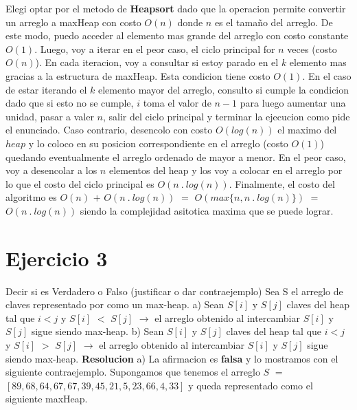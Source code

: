 \documentclass[10pt,a4paper]{article}
\begin{document}
Elegi optar por el metodo de \textbf{Heapsort} dado que la operacion  permite convertir un arreglo a maxHeap con costo $O(n)$ donde $n$ es el tamaño del arreglo. De este modo, puedo acceder al elemento mas grande del arreglo con costo constante $O(1)$. 
\newline
\newline
Luego, voy a iterar en el peor caso, el ciclo principal for $n$ veces (costo $O(n)$). En cada iteracion, voy a consultar si estoy parado en el $k$ elemento mas gracias a la estructura de maxHeap. Esta condicion tiene costo $O(1)$. En el caso de estar iterando el $k$ elemento mayor del arreglo, consulto si cumple la condicion  dado que si esto no se cumple, $i$ toma el valor de $n-1$ para luego aumentar una unidad, pasar a valer $n$, salir del ciclo principal y terminar la ejecucion como pide el enunciado. Caso contrario, desencolo con costo $O(log(n))$ el maximo del $heap$ y lo coloco en su posicion correspondiente en el arreglo (costo $O(1)$) quedando eventualmente el arreglo ordenado de mayor a menor.
\newline
\newline
En el peor caso, voy a desencolar a los $n$ elementos del heap y los voy a colocar en el arreglo por lo que el costo del ciclo principal es $O(n ~.~ log(n))$. 
\newline
\newline
Finalmente, el costo del algoritmo es $O(n)$ $+$ $O(n ~.~ log(n))$ $=$ $O(max\{n,n ~.~ log(n)\})$ $=$ $O(n ~.~ log(n))$ siendo la complejidad asitotica maxima que se puede lograr. 
\newpage

\section{Ejercicio 3}

Decir si es Verdadero o Falso (justificar o dar contraejemplo)
\newline
\newline
Sea S el arreglo de claves representado por como un max-heap.
\newline
\newline
a) Sean $S[i]$ y $S[j]$ claves del heap tal que $i < j$ y $S[i]$ $<$ $S[j]$ $\rightarrow$ el arreglo obtenido al intercambiar $S[i]$ y $S[j]$ sigue siendo max-heap.
\newline
\newline
b) Sean $S[i]$ y $S[j]$ claves del heap tal que $i < j$ y $S[i]$ $>$ $S[j]$ $\rightarrow$ el arreglo obtenido al intercambiar $S[i]$ y $S[j]$ sigue siendo max-heap.
\newline
\newline
\textbf{Resolucion}
\newline
\newline
a) La afirmacion es \textbf{falsa} y lo mostramos con el siguiente contraejemplo.
\newline
\newline
Supongamos que tenemos el arreglo $S$ $=$ $[89,68,64,67,67,39,45,21,5,23,66,4,33]$ y queda representado como el siguiente maxHeap.
\end{document}
